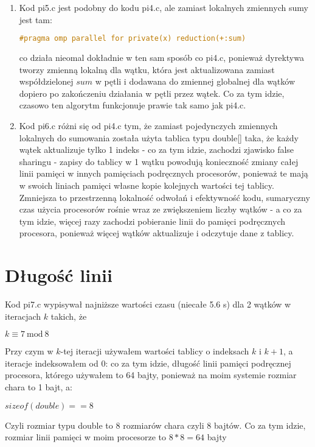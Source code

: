 \documentclass[12pt]{article}
\begin{document}
\begin{enumerate}
	\item Kod pi5.c jest podobny do kodu pi4.c, ale zamiast lokalnych zmiennych sumy jest tam:
	\begin{lstlisting}[language=C]
	#pragma omp parallel for private(x) reduction(+:sum)
	\end{lstlisting}
	co działa nieomal dokładnie w ten sam sposób co pi4.c, ponieważ dyrektywa tworzy zmienną lokalną dla wątku, która jest aktualizowana zamiast współdzielonej $sum$ w pętli i dodawana do zmiennej globalnej dla wątków dopiero po zakończeniu działania w pętli przez wątek. Co za tym idzie, czasowo ten algorytm funkcjonuje prawie tak samo jak pi4.c.\\
	
	\item Kod pi6.c różni się od pi4.c tym, że zamiast pojedynczych zmiennych lokalnych do sumowania została użyta tablica typu double[] taka, że każdy wątek aktualizuje tylko 1 indeks - co za tym idzie, zachodzi zjawisko false sharingu - zapisy do tablicy w 1 wątku powodują konieczność zmiany całej linii pamięci w innych pamięciach podręcznych procesorów, ponieważ te mają w swoich liniach pamięci własne kopie kolejnych wartości tej tablicy. Zmniejsza to  przestrzenną lokalność odwołań i efektywność kodu, sumaryczny czas użycia procesorów rośnie wraz ze zwiększeniem liczby wątków - a co za tym idzie, więcej razy zachodzi pobieranie linii do pamięci podręcznych procesora, ponieważ więcej wątków aktualizuje i odczytuje dane z tablicy.\\
	
\end{enumerate}
	 
\section{Długość linii}
Kod pi7.c wypisywał najniższe wartości czasu (niecałe 5.6 s) dla 2 wątków w iteracjach $k$ takich, że\\ 
\begin{center}
	$k\equiv7\ \textrm{mod}\ 8$
\end{center}
Przy czym w $k$-tej iteracji używałem wartości tablicy o indeksach $k$ i $k+1$, a iteracje indeksowałem od 0: co za tym idzie, długość linii pamięci podręcznej procesora, którego używałem to 64 bajty, ponieważ na moim systemie rozmiar chara to 1 bajt, a:
\begin{center}
	$sizeof(double)==8$
\end{center}
Czyli rozmiar typu double to 8 rozmiarów chara czyli 8 bajtów. Co za tym idzie, rozmiar linii pamięci w moim procesorze to $8*8=64$ bajty
\end{document}
